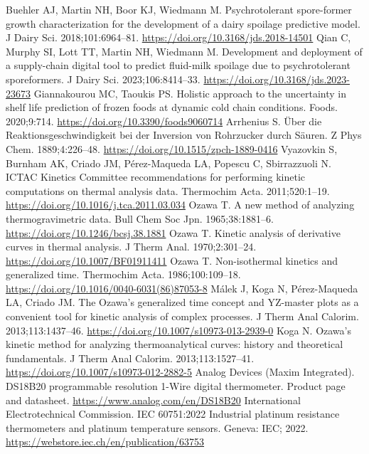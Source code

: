  Buehler AJ, Martin NH, Boor KJ, Wiedmann M. Psychrotolerant spore-former growth characterization for the development of a dairy spoilage predictive model. J Dairy Sci. 2018;101:6964--81. \url{https://doi.org/10.3168/jds.2018-14501}
 Qian C, Murphy SI, Lott TT, Martin NH, Wiedmann M. Development and deployment of a supply-chain digital tool to predict fluid-milk spoilage due to psychrotolerant sporeformers. J Dairy Sci. 2023;106:8414--33. \url{https://doi.org/10.3168/jds.2023-23673}
 Giannakourou MC, Taoukis PS. Holistic approach to the uncertainty in shelf life prediction of frozen foods at dynamic cold chain conditions. Foods. 2020;9:714. \url{https://doi.org/10.3390/foods9060714}
 Arrhenius S. Über die Reaktionsgeschwindigkeit bei der Inversion von Rohrzucker durch Säuren. Z Phys Chem. 1889;4:226--48. \url{https://doi.org/10.1515/zpch-1889-0416}
 Vyazovkin S, Burnham AK, Criado JM, Pérez-Maqueda LA, Popescu C, Sbirrazzuoli N. ICTAC Kinetics Committee recommendations for performing kinetic computations on thermal analysis data. Thermochim Acta. 2011;520:1--19. \url{https://doi.org/10.1016/j.tca.2011.03.034}
 Ozawa T. A new method of analyzing thermogravimetric data. Bull Chem Soc Jpn. 1965;38:1881--6. \url{https://doi.org/10.1246/bcsj.38.1881}
 Ozawa T. Kinetic analysis of derivative curves in thermal analysis. J Therm Anal. 1970;2:301--24. \url{https://doi.org/10.1007/BF01911411}
 Ozawa T. Non-isothermal kinetics and generalized time. Thermochim Acta. 1986;100:109--18. \url{https://doi.org/10.1016/0040-6031(86)87053-8}
 Málek J, Koga N, Pérez-Maqueda LA, Criado JM. The Ozawa's generalized time concept and YZ-master plots as a convenient tool for kinetic analysis of complex processes. J Therm Anal Calorim. 2013;113:1437--46. \url{https://doi.org/10.1007/s10973-013-2939-0}
 Koga N. Ozawa's kinetic method for analyzing thermoanalytical curves: history and theoretical fundamentals. J Therm Anal Calorim. 2013;113:1527--41. \url{https://doi.org/10.1007/s10973-012-2882-5}
 Analog Devices (Maxim Integrated). DS18B20 programmable resolution 1-Wire digital thermometer. Product page and datasheet. \url{https://www.analog.com/en/DS18B20}
 International Electrotechnical Commission. IEC 60751:2022 Industrial platinum resistance thermometers and platinum temperature sensors. Geneva: IEC; 2022. \url{https://webstore.iec.ch/en/publication/63753}
